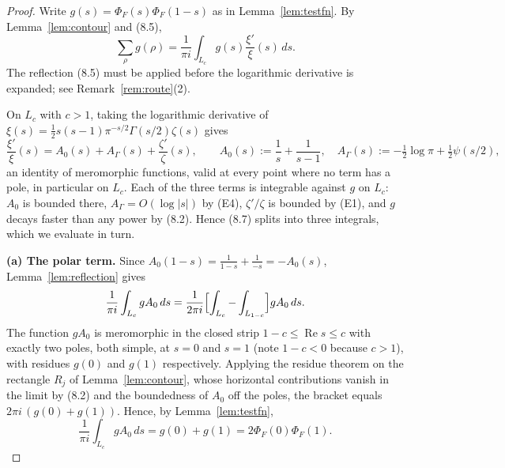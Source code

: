\documentclass[11pt]{amsart}
\theoremstyle{definition}
\theoremstyle{remark}
\newcommand{\Rel}{\operatorname{Re}}
\begin{document}
\begin{proof}
Write $g(s)=\Phi_F(s)\Phi_F(1-s)$ as in Lemma~\ref{lem:testfn}.  By
Lemma~\ref{lem:contour} and (8.5),
\begin{equation}
  \sum_\rho g(\rho)=\frac1{\pi i}\int_{L_c}g(s)\frac{\xi'}{\xi}(s)\,ds .
\tag{8.7}
\end{equation}
The reflection (8.5) must be applied before the logarithmic derivative is
expanded; see Remark~\ref{rem:route}(2).

On $L_c$ with $c>1$, taking the logarithmic derivative of
$\xi(s)=\tfrac12s(s-1)\pi^{-s/2}\Gamma(s/2)\zeta(s)$ gives
\begin{equation}
  \frac{\xi'}{\xi}(s)=A_0(s)+A_\Gamma(s)+\frac{\zeta'}{\zeta}(s),
  \qquad
  A_0(s):=\frac1s+\frac1{s-1},\quad
  A_\Gamma(s):=-\tfrac12\log\pi+\tfrac12\psi(s/2),
\tag{8.8}
\end{equation}
an identity of meromorphic functions, valid at every point where no term has a
pole, in particular on $L_c$.  Each of the three terms is integrable against
$g$ on $L_c$: $A_0$ is bounded there, $A_\Gamma=O(\log|s|)$ by (E4),
$\zeta'/\zeta$ is bounded by (E1), and $g$ decays faster than any power by
(8.2).  Hence (8.7) splits into three integrals, which we evaluate in turn.

\medskip
\noindent\textbf{(a) The polar term.}  Since
$A_0(1-s)=\frac1{1-s}+\frac1{-s}=-A_0(s)$, Lemma~\ref{lem:reflection} gives
\[
  \frac1{\pi i}\int_{L_c}gA_0\,ds
  =\frac1{2\pi i}\Bigl[\int_{L_c}-\int_{L_{1-c}}\Bigr]gA_0\,ds .
\]
The function $gA_0$ is meromorphic in the closed strip $1-c\le\Rel s\le c$
with exactly two poles, both simple, at $s=0$ and $s=1$ (note $1-c<0$ because
$c>1$), with residues $g(0)$ and $g(1)$ respectively.  Applying the residue
theorem on the rectangle $R_j$ of Lemma~\ref{lem:contour}, whose horizontal
contributions vanish in the limit by (8.2) and the boundedness of $A_0$ off the
poles, the bracket equals $2\pi i\,(g(0)+g(1))$.  Hence, by
Lemma~\ref{lem:testfn},
\begin{equation}
  \frac1{\pi i}\int_{L_c}gA_0\,ds=g(0)+g(1)=2\Phi_F(0)\Phi_F(1).
\tag{8.9}
\end{equation}


\end{proof}
\end{document}
